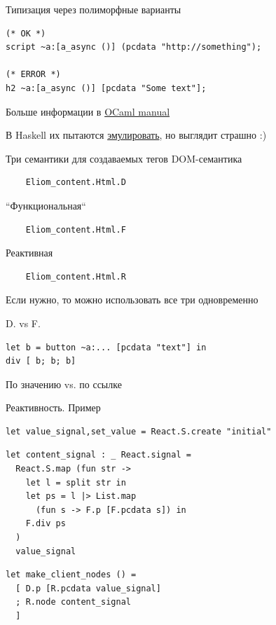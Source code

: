\documentclass{beamer}
\theoremstyle{definition}
\begin{document}
\begin{frame}[fragile]{Типизация через полиморфные варианты}
\begin{verbatim}
(* OK *)
script ~a:[a_async ()] (pcdata "http://something");  

(* ERROR *)
h2 ~a:[a_async ()] [pcdata "Some text"];
\end{verbatim}

Больше информации в 
\href{https://caml.inria.fr/pub/docs/manual-ocaml/lablexamples.html#sec46}{OCaml manual}

В Haskell их пытаются \href{https://hackage.haskell.org/package/data-diverse-2.0.1.0/docs/Data-Diverse-Which.html}
{эмулировать}, 
но выглядит страшно :)
\end{frame}

\begin{frame}[fragile]{Три семантики для создаваемых тегов}
DOM-семантика
\begin{verbatim}
    Eliom_content.Html.D
\end{verbatim}
``Функциональная``
\begin{verbatim}
    Eliom_content.Html.F
\end{verbatim}
Реактивная
\begin{verbatim}
    Eliom_content.Html.R
\end{verbatim}
\vskip5mm
Если нужно, то можно использовать все три одновременно
\end{frame}

\begin{frame}[fragile]{D. vs F.}
\begin{verbatim}
let b = button ~a:... [pcdata "text"] in
div [ b; b; b]
\end{verbatim}
\vskip5mm
По значению vs. по ссылке
\end{frame}

\begin{frame}[fragile]{Реактивность. Пример}
\begin{verbatim}
let value_signal,set_value = React.S.create "initial"
\end{verbatim}
\pause\vspace{-2pt}
\begin{verbatim}
let content_signal : _ React.signal =
  React.S.map (fun str ->
    let l = split str in
    let ps = l |> List.map 
      (fun s -> F.p [F.pcdata s]) in
    F.div ps
  )
  value_signal
\end{verbatim}
\pause\vspace{-2pt}
\begin{verbatim}
let make_client_nodes () =
  [ D.p [R.pcdata value_signal]
  ; R.node content_signal
  ]
\end{verbatim}
\end{frame}
\end{document}
